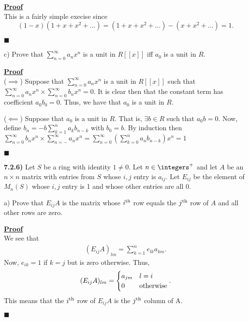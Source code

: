 \documentclass[12pt,a4paper]{article}
\newcommand{\prob}[2]{\textbf{#1)} #2}
\newenvironment{proof}
{
\textbf{\underline{Proof}} \\
}
{
\begin{flushright}
$\blacksquare$
\end{flushright}}
\begin{document}
\begin{proof}
    This is a fairly simple execise since
    \[
        \left( 1-x \right)\left( 1 + x + x^2 + \ldots \right) = \left( 1 + x + x^2 + \ldots \right) - \left( x + x^2 + \ldots \right) = 1
    .\]
\end{proof}

c) Prove that $\sum_{n=0}^{\infty} a_n x^n$ is a unit in $R[[x]]$ iff $a_0$ is a unit in $R$.

\begin{proof}
    ($\implies$) Suppose that $\sum_{n=0}^{\infty} a_n x^n$ is a unit in $R[[x]]$ such that $\sum_{n=0}^{\infty} a_n x^n \times \sum_{n=0}^{\infty} b_{n}x^{n} = 0$. 
    It is clear then that the constant term has coefficient $a_0b_0 = 0$. 
    Thus, we have that $a_0$ is a unit in $R$.


    ($\impliedby$) Suppose that $a_0$ is a unit in $R$. 
    That is, $\exists b \in R$ such that $a_0b = 0$. 
    Now, define $b_{n} = -b\sum_{k=1}^{n} a_{k}b_{n-k}$ with $b_0 = b$.
    By induction then $\sum_{n=0}^{\infty} b_{n}x^{n} \times \sum_{n=-}^{\infty} a_n x^n = \sum_{n=0}^{\infty} \left( \sum_{k=0}^{n} a_n b_{n-k} \right) x^{n} = 1$ 
\end{proof}

\prob{7.2.6}{
Let $S$ be a ring with identity $1 \ne 0$. Let $n \in \integers^{+}$ and let $A$ be an $n \times n$ matrix with entries from $S$ whose $i,j$ entry is $a_{ij}$. Let $E_{ij}$ be the element of $M_{n}(S)$ whose $i,j$ entry is 1 and whose other entries are all 0.
}

a) Prove that $E_{ij}A$ is the matrix whose $i^{\rm th}$ row equals the $j^{\rm th}$ row of $A$ and all other rows are zero.

\begin{proof}
    We see that
    \begin{align*}
        (E_{ij}A)_{lm} = \sum_{k=1}^{n} e_{lk}a_{km}
    .\end{align*}
    Now, $e_{ik} = 1$ if $k = j$ but is zero otherwise.
    Thus, 
    \begin{align*}
        (E_{ij}A)_{lm} = \begin{cases}
            a_{jm} & l = i \\
            0 & {\rm otherwise}
        \end{cases}
    .\end{align*}
    This means that the $i^{\rm th}$ row of $E_{ij}A$ is the $j^{\rm th}$ column of A. 
\end{proof}
\end{document}
